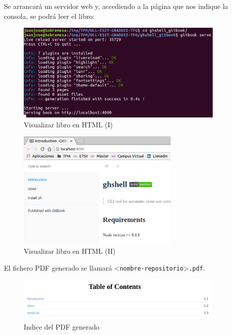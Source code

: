 \begin{itemize}
	Se arrancará un servidor web y, accediendo a la página que nos indique la consola, se podrá leer el libro:
	
		\begin{figure}[H]
		\begin{center}
		\includegraphics[width=0.9\textwidth]{images/ghshell8-5}
		\caption{Visualizar libro en HTML (I)}
		\label{fig:ghshell8-5}
		\end{center}
		\end{figure}
		
		\begin{figure}[H]
		\begin{center}
		\includegraphics[width=0.7\textwidth]{images/ghshell8-10}
		\caption{Visualizar libro en HTML (II)}
		\label{fig:ghshell8-10}
		\end{center}
		\end{figure}

\newpage		
		
	El fichero PDF generado se llamará \textless \verb|nombre-repositorio|\textgreater \verb|.pdf|. 
	
        \begin{figure}[H]
		\begin{center}
		\includegraphics[width=0.9\textwidth]{images/ghshell8-6}
		\caption{Indice del PDF generado}
		\label{fig:ghshell8-6}
		\end{center}
		\end{figure}
		

\end{itemize}
